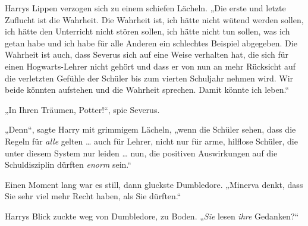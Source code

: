 Harrys Lippen verzogen sich zu einem schiefen Lächeln. „Die erste und letzte Zuflucht ist die Wahrheit. Die Wahrheit ist, ich hätte nicht wütend werden sollen, ich hätte den Unterricht nicht stören sollen, ich hätte nicht tun sollen, was ich getan habe und ich habe für alle Anderen ein schlechtes Beispiel abgegeben. Die Wahrheit ist auch, dass Severus sich auf eine Weise verhalten hat, die sich für einen Hogwarts-Lehrer nicht gehört und dass er von nun an mehr Rücksicht auf die verletzten Gefühle der Schüler bis zum vierten Schuljahr nehmen wird. Wir beide könnten aufstehen und die Wahrheit sprechen. Damit könnte ich leben.“ 

„In Ihren Träumen, Potter!“, spie Severus. 

„Denn“, sagte Harry mit grimmigem Lächeln, „wenn die Schüler sehen, dass die Regeln für \emph{alle} gelten … auch für Lehrer, nicht nur für arme, hilflose Schüler, die unter diesem System nur leiden … nun, die positiven Auswirkungen auf die Schuldisziplin dürften \emph{enorm} sein.“ 

Einen Moment lang war es still, dann gluckste Dumbledore. „Minerva denkt, dass Sie sehr viel mehr Recht haben, als Sie dürften.“ 

Harrys Blick zuckte weg von Dumbledore, zu Boden. „\emph{Sie} lesen \emph{ihre} Gedanken?“ 

